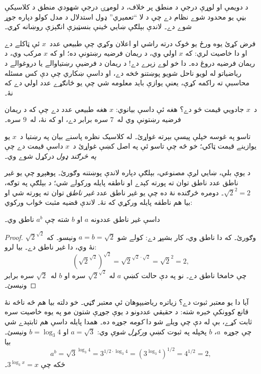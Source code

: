 \documentclass[../../../include/open-logic-section]{subfiles}
\begin{document}


د دويمې او لوړې درجې د منطق پر خلاف، د لومړۍ درجې شهودي منطق د
کلاسیکې بڼې يو محدود شوے نظام دے چې د لا ``تعميري'' ډول استدلال د مدل
کولو دپاره جوړ شوے دے۔ لاندې بېلګې ښايي ځينې بنسټيزې انګېزې روښانه کړي۔

فرض کړئ يوه ورځ يو څوک درته راشي او اعلان وکړي چې طبيعي عدد~$x$ ئې
ټاکلے دے او دا خاصيت لري: که $x$ اولي وي، د ريمان فرضيه رښتونې ده؛
او که $x$ مرکب وي، د ريمان فرضيه دروغ ده۔ دا خو لوے زېرے دے!{} د
ريمان د فرضيې رښتياوالے يا دروغوالے د رياضياتو له لويو ناحل شويو
پوښتنو څخه دے، او داسې ښکاري چې دې کس مسئله محاسبې ته راکمه کړې،
يعنې يوازې بايد معلومه شي چې يو ځانګړے عدد اولي دے که نۀ۔

د~$x$ جادويي قيمت څو دے؟ هغه ئې داسې بيانوي: $x$ هغه طبيعي عدد دے
چې که د ريمان فرضيه رښتونې وي له~$7$ سره برابر دے، او که نۀ،
له~$9$ سره۔

تاسو په غوسه خپلې پيسې بېرته غواړئ۔ له کلاسیک نظره پاسنے بيان په
رښتيا د~$x$ يو يوازينے قيمت ټاکي؛ خو څه چې تاسو ئې په اصل کښې غواړئ
د~$x$ داسې قيمت دے چې \emph{په څرګند ډول} درکړل شوے وي۔

د يوې بلې، ښايي لږې مصنوعي، بېلګې دپاره لاندې پوښتنه وګورئ۔ پوهېږو
چې يو غير ناطق عدد ناطق توان ته پورته کېدے او ناطقه پايله ورکولے شي؛
د بېلګې په توګه، $\sqrt{2}^2 = 2$۔ دومره څرګنده نۀ ده چې يو غير ناطق
عدد \emph{غير ناطق} توان ته پورته شي او بيا هم ناطقه پايله ورکړي که
نۀ۔ لاندې قضيه مثبت ځواب ورکوي:

\begin{thm}
داسې غير ناطق عددونه $a$ او $b$ شته چې $a^b$ ناطق وي۔
\end{thm}

\begin{proof}
$\sqrt{2}^{\sqrt{2}}$ وګورئ۔ که دا ناطق وي، کار بشپړ دے: کولے شو
$a = b = \sqrt{2}$ ونيسو۔ که نۀ وي، دا غير ناطق دے۔ بيا لرو:
\[
(\sqrt{2}^{\sqrt{2}})^{\sqrt{2}} = \sqrt{2}^{\sqrt{2} \cdot
  \sqrt{2}} = \sqrt{2}^2 = 2,
\]
چې خامخا ناطق دے۔ نو په دې حالت کښې $a$ له
$\sqrt{2}^{\sqrt{2}}$ سره او $b$ له~$\sqrt 2$ سره برابر ونيسئ۔
\end{proof}

آيا دا يو معتبر ثبوت دے؟ زياتره رياضيپوهان ئې معتبر ګڼي۔ خو دلته بيا
هم څه ناڅه نۀ قانع کوونکې خبره شته: د حقيقي عددونو د يوې جوړې شتون
مو په يوه خاصيت سره ثابت کړے، بې له دې چې ويلے شو دا \emph{کومه}
جوړه ده۔ همدا پايله داسې هم ثابتېدے شي چې جوړه~$a$، $b$ پخپله په
ثبوت کښې \emph{ورکړل شوې} وي: $a = \sqrt{3}$ او $b = \log_3 4$
ونيسئ۔ بيا
\[
a^b = \sqrt{3}^{\log_3 4} = 3^{1/2 \cdot \log_3 4} = (3^{\log_3
  4})^{1/2} = 4^{1/2}= 2,
\]
ځکه چې $3^{\log_3 x} = x$۔
\end{document}
